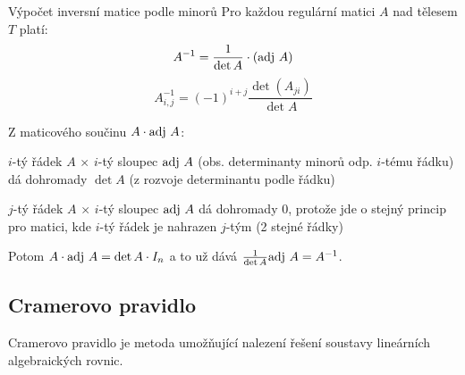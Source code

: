 \begin{vetaN}{Výpočet inversní matice podle minorů}
Pro každou regulární matici $A$ nad tělesem $T$ platí: 
$$A^{-1}=\frac{1}{\det A}\cdot(\mathrm{adj\ } A)$$
$$A^{-1}_{i,j}=(-1)^{i+j}\frac{\det(A_{ji})}{\det A}$$

\begin{dukaz}
Z maticového součinu $A\cdot\mathrm{adj\ } A$:
\begin{penumerate}
    \item $i$-tý řádek $A$ $\times$ $i$-tý sloupec $\mathrm{adj\ } A$ (obs. determinanty minorů odp. $i$-tému řádku) dá dohromady $\det A$
    (z rozvoje determinantu podle řádku)
    \item $j$-tý řádek $A$ $\times$ $i$-tý sloupec $\mathrm{adj\ } A$ dá dohromady $0$, protože jde o stejný princip pro matici, kde $i$-tý
    řádek je nahrazen $j$-tým (2 stejné řádky)
\end{penumerate}
Potom $A\cdot\mathrm{adj\ } A = \det A\cdot I_n$ a to už dává $\frac{1}{\det A}\mathrm{adj\ } A = A^{-1}$.
\end{dukaz}
\end{vetaN}


\subsection{Cramerovo pravidlo}
Cramerovo pravidlo je metoda umožňující nalezení řešení soustavy lineárních algebraických rovnic.


